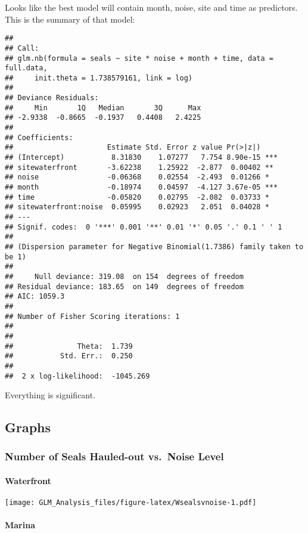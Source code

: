 \documentclass[
]{article}
\begin{document}
Looks like the best model will contain month, noise, site and time as
predictors. This is the summary of that model:

\begin{verbatim}
## 
## Call:
## glm.nb(formula = seals ~ site * noise + month + time, data = full.data, 
##     init.theta = 1.738579161, link = log)
## 
## Deviance Residuals: 
##     Min       1Q   Median       3Q      Max  
## -2.9338  -0.8665  -0.1937   0.4408   2.4225  
## 
## Coefficients:
##                      Estimate Std. Error z value Pr(>|z|)    
## (Intercept)           8.31830    1.07277   7.754 8.90e-15 ***
## sitewaterfront       -3.62238    1.25922  -2.877  0.00402 ** 
## noise                -0.06368    0.02554  -2.493  0.01266 *  
## month                -0.18974    0.04597  -4.127 3.67e-05 ***
## time                 -0.05820    0.02795  -2.082  0.03733 *  
## sitewaterfront:noise  0.05995    0.02923   2.051  0.04028 *  
## ---
## Signif. codes:  0 '***' 0.001 '**' 0.01 '*' 0.05 '.' 0.1 ' ' 1
## 
## (Dispersion parameter for Negative Binomial(1.7386) family taken to be 1)
## 
##     Null deviance: 319.08  on 154  degrees of freedom
## Residual deviance: 183.65  on 149  degrees of freedom
## AIC: 1059.3
## 
## Number of Fisher Scoring iterations: 1
## 
## 
##               Theta:  1.739 
##           Std. Err.:  0.250 
## 
##  2 x log-likelihood:  -1045.269
\end{verbatim}

Everything is significant.

\hypertarget{graphs}{%
\subsection{Graphs}\label{graphs}}

\hypertarget{number-of-seals-hauled-out-vs.-noise-level}{%
\subsubsection{Number of Seals Hauled-out vs.~Noise
Level}\label{number-of-seals-hauled-out-vs.-noise-level}}

\hypertarget{waterfront}{%
\paragraph{Waterfront}\label{waterfront}}

\texttt{[image: GLM\_Analysis\_files/figure-latex/Wsealsvnoise-1.pdf]}

\hypertarget{marina}{%
\paragraph{Marina}\label{marina}}
\end{document}
